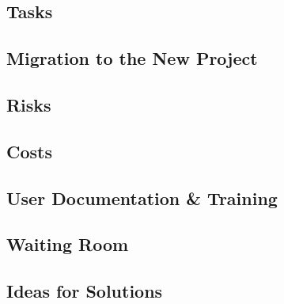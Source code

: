 \documentclass[titlepage]{article}
\begin{document}
\subsection{Tasks}

\subsection{Migration to the New Project}

\subsection{Risks}

\subsection{Costs}

\subsection{User Documentation \& Training}

\subsection{Waiting Room}

\subsection{Ideas for Solutions}

\pagebreak
\printindex
\end{document}
